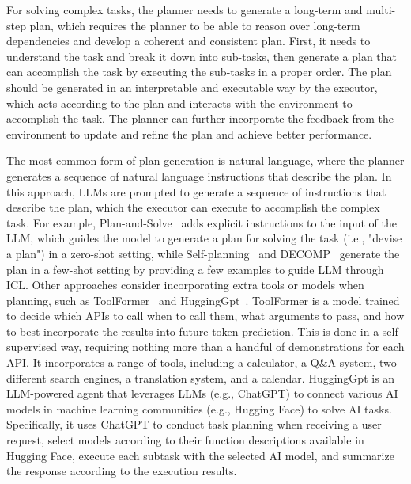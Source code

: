 For solving complex tasks, the planner needs to generate a long-term and multi-step plan, which requires the planner to be able to reason over long-term dependencies and develop a coherent and consistent plan.
First, it needs to understand the task and break it down into sub-tasks, then generate a plan that can accomplish the task by executing the sub-tasks in a proper order.
The plan should be generated in an interpretable and executable way by the executor, which acts according to the plan and interacts with the environment to accomplish the task.
The planner can further incorporate the feedback from the environment to update and refine the plan and achieve better performance.

The most common form of plan generation is natural language, where the planner generates a sequence of natural language instructions that describe the plan.
In this approach, LLMs are prompted to generate a sequence of instructions that describe the plan, which the executor can execute to accomplish the complex task.
For example, Plan-and-Solve~\cite{wang2023plan} adds explicit instructions to the input of the LLM, which guides the model to generate a plan for solving the task (i.e., "devise a plan") in a zero-shot setting, while Self-planning~\cite{jiang2024selfplanning} and DECOMP~\cite{khot2022decomposed} generate the plan in a few-shot setting by providing a few examples to guide LLM through ICL\@.
Other approaches consider incorporating extra tools or models when planning, such as ToolFormer~\cite{schick2023toolformer} and HuggingGpt~\cite{shen2023hugginggpt}.
ToolFormer is a model trained to decide which APIs to call when to call them, what arguments to pass, and how to best incorporate the results into future token prediction.
This is done in a self-supervised way, requiring nothing more than a handful of demonstrations for each API. It incorporates a range of tools, including a calculator, a Q\&A system, two different search engines, a translation system, and a calendar.
HuggingGpt is an LLM-powered agent that leverages LLMs (e.g., ChatGPT) to connect various AI models in machine learning communities (e.g., Hugging Face) to solve AI tasks.
Specifically, it uses ChatGPT to conduct task planning when receiving a user request, select models according to their function descriptions available in Hugging Face, execute each subtask with the selected AI model, and summarize the response according to the execution results.


